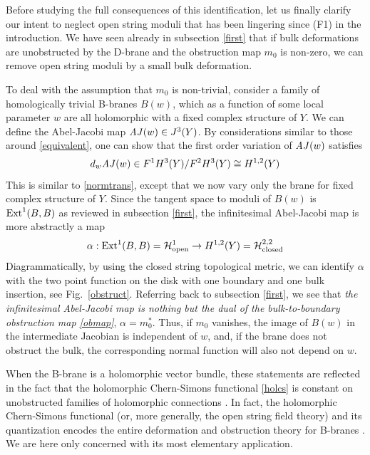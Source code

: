 Before studying the full consequences of this identification, let us
finally clarify our intent to neglect open string moduli that has 
been lingering since (F1) in the introduction. We have seen already 
in subsection \ref{first} that if bulk deformations are unobstructed
by the D-brane and the obstruction map $m_0$ is non-zero, we can
remove open string moduli by a small bulk deformation. 

To deal with the assumption that $m_0$ is non-trivial, consider a 
family of homologically trivial B-branes $B(w)$, which as a function 
of some local parameter $w$ are all holomorphic with a fixed complex 
structure of $Y$. We can define the Abel-Jacobi map ${\it AJ}(w)\in 
J^3(Y)$. By considerations similar to those around \eqref{equivalent}, 
one can show that the first order variation of ${\it AJ}(w)$ satisfies
\begin{equation}
d_w {\it AJ}(w) \in F^1H^3(Y)/F^2H^3(Y)\cong H^{1,2}(Y)
\end{equation}
This is similar to \eqref{normtrans}, except that we now vary only
the brane for fixed complex structure of $Y$. Since the tangent space
to moduli of $B(w)$ is ${\rm Ext}^1(B,B)$ as reviewed in subsection
\ref{first}, the infinitesimal Abel-Jacobi map is more abstractly a
map
\begin{equation}
\eqlabel{infaj}
\alpha: {\rm Ext}^1(B,B)=\calh^1_{\rm open} \to H^{1,2}(Y)= \calh^{2,2}_{\rm closed}
\end{equation}
Diagrammatically, by using the closed string topological metric, we can
identify $\alpha$ with the two point function on the disk with one
boundary and one bulk insertion, see Fig.\ \ref{obstruct}. Referring
back to subsection \ref{first}, we see that {\it the infinitesimal 
Abel-Jacobi map is nothing but the dual of the bulk-to-boundary 
obstruction map \eqref{obmap}}, $\alpha=m_0^*$. Thus, if $m_0$ 
vanishes, the image of $B(w)$ in the intermediate Jacobian is 
independent of $w$, and, if the brane does not obstruct the bulk, 
the corresponding normal function will also not depend on $w$.

When the B-brane is a holomorphic vector bundle, these statements
are reflected in the fact that the holomorphic Chern-Simons functional
\eqref{holcs} is constant on unobstructed families of holomorphic 
connections \cite{doth}. In fact, the holomorphic Chern-Simons functional
(or, more generally, the open string field theory) and its quantization
encodes the entire deformation and obstruction theory for B-branes 
\cite{clemens}. We are here only concerned with its most elementary 
application.

